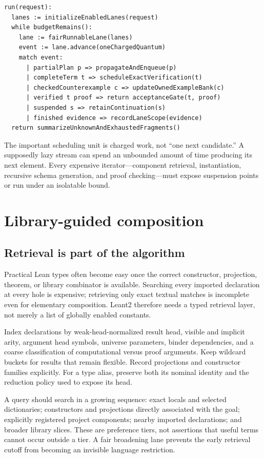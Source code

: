 \documentclass[11pt,letterpaper]{article}
\theoremstyle{definition}
\theoremstyle{remark}
\begin{document}
\Needspace{206pt}
\begin{lstlisting}[caption={Portfolio-level synthesis loop. Pseudocode.}]
run(request):
  lanes := initializeEnabledLanes(request)
  while budgetRemains():
    lane := fairRunnableLane(lanes)
    event := lane.advance(oneChargedQuantum)
    match event:
      | partialPlan p => propagateAndEnqueue(p)
      | completeTerm t => scheduleExactVerification(t)
      | checkedCounterexample c => updateOwnedExampleBank(c)
      | verified t proof => return acceptanceGate(t, proof)
      | suspended s => retainContinuation(s)
      | finished evidence => recordLaneScope(evidence)
  return summarizeUnknownAndExhaustedFragments()
\end{lstlisting}

The important scheduling unit is charged work, not ``one next candidate.'' A supposedly lazy stream can spend an unbounded amount of time producing its next element. Every expensive iterator---component retrieval, instantiation, recursive schema generation, and proof checking---must expose suspension points or run under an isolatable bound.

\section{Library-guided composition}
\label{sec:library}

\subsection{Retrieval is part of the algorithm}

Practical Lean types often become easy once the correct constructor, projection, theorem, or library combinator is available. Searching every imported declaration at every hole is expensive; retrieving only exact textual matches is incomplete even for elementary composition. Leant2 therefore needs a typed retrieval layer, not merely a list of globally enabled constants.

Index declarations by weak-head-normalized result head, visible and implicit arity, argument head symbols, universe parameters, binder dependencies, and a coarse classification of computational versus proof arguments. Keep wildcard buckets for results that remain flexible. Record projections and constructor families explicitly. For a type alias, preserve both its nominal identity and the reduction policy used to expose its head.

A query should search in a growing sequence: exact locals and selected dictionaries; constructors and projections directly associated with the goal; explicitly registered project components; nearby imported declarations; and broader library slices. These are preference tiers, not assertions that useful terms cannot occur outside a tier. A fair broadening lane prevents the early retrieval cutoff from becoming an invisible language restriction.
\end{document}
